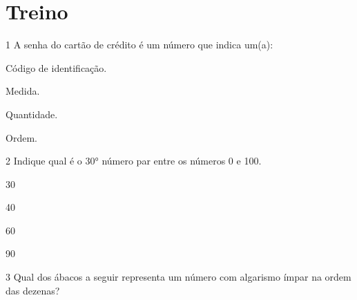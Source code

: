 \section*{Treino}

\num{1} A senha do cartão de crédito é um número que indica um(a):

\begin{escolha}[itemsep=+2pt]
\item Código de identificação.

\item Medida.

\item Quantidade.

\item Ordem.
\end{escolha}

\num{2} Indique qual é o 30° número par entre os números 0 e 100.

\begin{escolha}[itemsep=+2pt]
\item 30

\item 40

\item 60

\item 90
\end{escolha}

\pagebreak
\num{3} Qual dos ábacos a seguir representa um número com algarismo ímpar na ordem
das dezenas?

